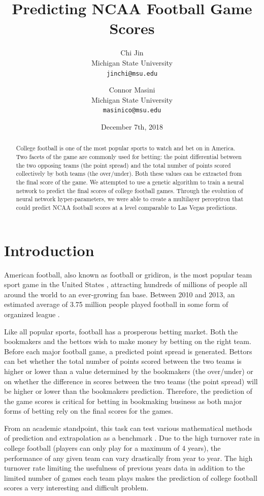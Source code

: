 \documentclass[10pt,twocolumn,letterpaper]{article}
\title{Predicting NCAA Football Game Scores}
\author{Chi Jin \\
Michigan State University \\
{\tt\small jinchi@msu.edu}
\and
Connor Masini\\
Michigan State University\\
{\tt\small masinico@msu.edu}
\date{December 7th, 2018}
}
\begin{document}
\maketitle
\begin{abstract}

College football is one of the most popular sports to watch and bet on in America. Two facets of the game are commonly used for betting: the point differential between the two opposing teams (the point spread) and the total number of points scored collectively by both teams (the over/under). Both these values can be extracted from the final score of the game. We attempted to use a genetic algorithm to train a neural network to predict the final scores of college football games. Through the evolution of neural network hyper-parameters, we were able to create a multilayer perceptron that could predict NCAA football scores at a level comparable to Las Vegas predictions.

\end{abstract}

\section{Introduction}
American football, also known as football or gridiron, is the most popular team sport game in the United States \cite{favsport}, attracting hundreds of millions of people all around the world to an ever-growing fan base.  Between 2010 and 2013, an estimated average of 3.75 million people played football in some form of organized league \cite{ncaa}.
 
Like all popular sports, football has a prosperous betting market.  Both the bookmakers and the bettors wish to make money by betting on the right team.  Before each major football game, a predicted point spread is generated.  Bettors can bet whether the total number of points scored between the two teams is higher or lower than a value determined by the bookmakers (the over/under) or on whether the difference in scores between the two teams (the point spread) will be higher or lower than the bookmakers prediction.  Therefore, the prediction of the game scores is critical for betting in bookmaking business as both major forms of betting rely on the final scores for the games.

From an academic standpoint, this task can test various mathematical methods of prediction and extrapolation as a benchmark \cite{forcast}.  Due to the high turnover rate in college football (players can only play for a maximum of 4 years), the performance of any given team can vary drastically from year to year.  The high turnover rate limiting the usefulness of previous years data in addition to the limited number of games each team plays makes the prediction of college football scores a very interesting and difficult problem.  
\end{document}
